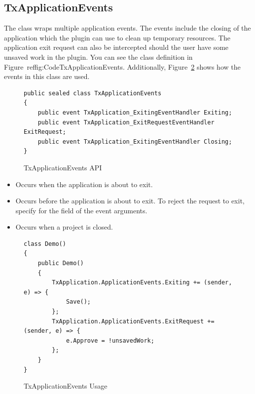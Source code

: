 \subsection{TxApplicationEvents}
\label{ch:TxApplicationEvents}

The  class wraps multiple application events. The events include the closing of the application which the plugin can use to clean up temporary resources. The application exit request can also be intercepted should the user have some unsaved work in the plugin. You can see the class definition in Figure~ref{fig:CodeTxApplicationEvents}. Additionally, Figure~\ref{fig:CodeTxApplicationEventsUsage} shows how the events in this class are used.

\begin{figure}[H]
    \caption{TxApplicationEvents API}
    \centering
    \begin{verbatim}
public sealed class TxApplicationEvents
{
    public event TxApplication_ExitingEventHandler Exiting;
    public event TxApplication_ExitRequestEventHandler ExitRequest;
    public event TxApplication_ExitingEventHandler Closing;
}
    \end{verbatim}
    \label{fig:CodeTxApplicationEvents}
\end{figure}

\begin{itemize}

\item {} Occurs when the application is about to exit.

\item {} Occurs before the application is about to exit.
To reject the request to exit, specify  for the  field of the event arguments.

\item {} Occurs when a project is closed.

\end{itemize}

\begin{figure}[H]
    \caption{TxApplicationEvents Usage}
    \centering
    \begin{verbatim}
class Demo()
{
    public Demo()
    {
        TxApplication.ApplicationEvents.Exiting += (sender, e) => {
            Save();
        };
        TxApplication.ApplicationEvents.ExitRequest += (sender, e) => {
            e.Approve = !unsavedWork;
        };
    }
}
    \end{verbatim}
    \label{fig:CodeTxApplicationEventsUsage}
\end{figure}

